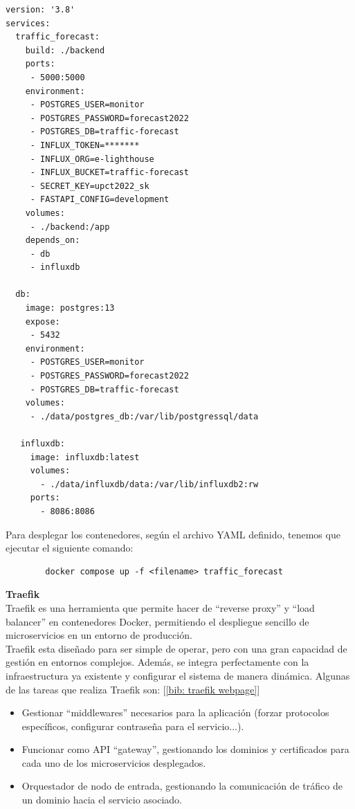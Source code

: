 \documentclass[a4paper, oneside, 12pt]{book}
\begin{document}
	\begin{lstlisting}[style=yaml, caption={Archivo configuración de contenedores para entorno de desarrollo.}]
version: '3.8'
services:
  traffic_forecast:
    build: ./backend
    ports:
     - 5000:5000
    environment:
     - POSTGRES_USER=monitor
     - POSTGRES_PASSWORD=forecast2022
     - POSTGRES_DB=traffic-forecast
     - INFLUX_TOKEN=*******
     - INFLUX_ORG=e-lighthouse
     - INFLUX_BUCKET=traffic-forecast
     - SECRET_KEY=upct2022_sk
     - FASTAPI_CONFIG=development
    volumes:
     - ./backend:/app
    depends_on:
     - db
     - influxdb

  db:
    image: postgres:13
    expose:
     - 5432
    environment:
     - POSTGRES_USER=monitor
     - POSTGRES_PASSWORD=forecast2022
     - POSTGRES_DB=traffic-forecast
    volumes:
     - ./data/postgres_db:/var/lib/postgressql/data
    
   influxdb:
     image: influxdb:latest
     volumes:
       - ./data/influxdb/data:/var/lib/influxdb2:rw
     ports:
       - 8086:8086
	\end{lstlisting}

	\pagebreak
	
	\noindent Para desplegar los contenedores, según el archivo YAML definido, tenemos que ejecutar el siguiente comando: 
	
	\begin{verbatim}
		docker compose up -f <filename> traffic_forecast
	\end{verbatim}
	
	\noindent \textbf{\large Traefik} \\
	
	\noindent Traefik es una herramienta que permite hacer de ``reverse proxy'' y ``load balancer'' en contenedores Docker, permitiendo el despliegue sencillo de microservicios en un entorno de producción. \\
	
	\noindent Traefik esta diseñado para ser simple de operar, pero con una gran capacidad de gestión en entornos complejos. Además, se integra perfectamente con la infraestructura ya existente y configurar el sistema de manera dinámica. Algunas de las tareas que realiza Traefik son: [\ref{bib: traefik webpage}] 
	
	\begin{itemize}
		\item Gestionar ``middlewares'' necesarios para la aplicación (forzar protocolos específicos, configurar contraseña para el servicio...).
		\item Funcionar como API ``gateway'', gestionando los dominios y certificados para cada uno de los microservicios desplegados.
		\item Orquestador de nodo de entrada, gestionando la comunicación de tráfico de un dominio hacia el servicio asociado.
	\end{itemize}
\end{document}
